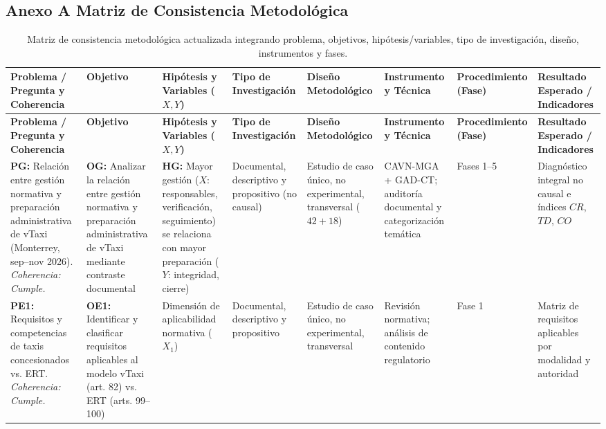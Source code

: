 {\begin{aulatexlandscape}
\section*{Anexo A Matriz de Consistencia Metodológica}
\begingroup\fontsize{7.1}{8.8}\selectfont
\setlength{\tabcolsep}{2.5pt}
\begin{longtable}{@{}p{2.9cm}p{2.9cm}p{2.5cm}p{2.2cm}p{2.2cm}p{2.1cm}p{1.6cm}p{2.5cm}@{}}
\caption{Matriz de consistencia metodológica actualizada integrando problema, objetivos, hipótesis/variables, tipo de investigación, diseño, instrumentos y fases.}\\
\toprule
\textbf{Problema / Pregunta y Coherencia} & \textbf{Objetivo} & \textbf{Hipótesis y Variables ($X, Y$)} & \textbf{Tipo de Investigación} & \textbf{Diseño Metodológico} & \textbf{Instrumento y Técnica} & \textbf{Procedimiento (Fase)} & \textbf{Resultado Esperado / Indicadores} \\
\midrule
\endfirsthead
\toprule
\textbf{Problema / Pregunta y Coherencia} & \textbf{Objetivo} & \textbf{Hipótesis y Variables ($X, Y$)} & \textbf{Tipo de Investigación} & \textbf{Diseño Metodológico} & \textbf{Instrumento y Técnica} & \textbf{Procedimiento (Fase)} & \textbf{Resultado Esperado / Indicadores} \\
\midrule
\endhead
\textbf{PG:} Relación entre gestión normativa y preparación administrativa de vTaxi (Monterrey, sep--nov 2026). \textit{Coherencia: Cumple.} & \textbf{OG:} Analizar la relación entre gestión normativa y preparación administrativa de vTaxi mediante contraste documental & \textbf{HG:} Mayor gestión ($X$: responsables, verificación, seguimiento) se relaciona con mayor preparación ($Y$: integridad, cierre) & Documental, descriptivo y propositivo (no causal) & Estudio de caso único, no experimental, transversal ($42+18$) & CAVN-MGA + GAD-CT; auditoría documental y categorización temática & Fases 1--5 & Diagnóstico integral no causal e índices $CR$, $TD$, $CO$ \\
\midrule
\textbf{PE1:} Requisitos y competencias de taxis concesionados vs. ERT. \textit{Coherencia: Cumple.} & \textbf{OE1:} Identificar y clasificar requisitos aplicables al modelo vTaxi (art. 82) vs. ERT (arts. 99--100) & Dimensión de aplicabilidad normativa ($X_1$) & Documental, descriptivo y propositivo & Estudio de caso único, no experimental, transversal & Revisión normativa; análisis de contenido regulatorio & Fase 1 & Matriz de requisitos aplicables por modalidad y autoridad \\

\end{longtable}
\end{aulatexlandscape}}
